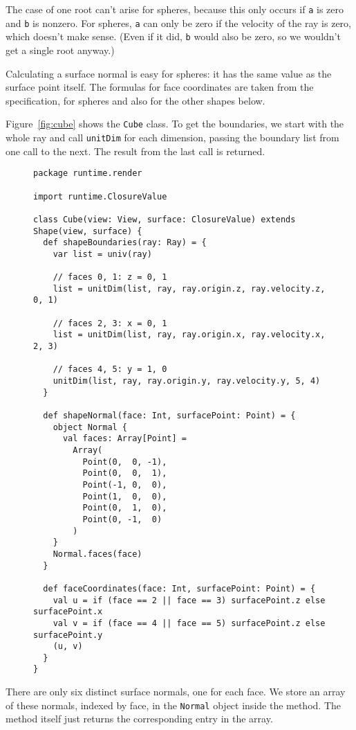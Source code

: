 The case of one root can't arise for spheres,
because this only occurs if \verb!a! is zero and \verb!b! is nonzero.
For spheres, \verb!a! can only be zero if the velocity of the ray is zero,
which doesn't make sense.
(Even if it did, \verb!b! would also be zero,
so we wouldn't get a single root anyway.)

Calculating a surface normal is easy for spheres:
it has the same value as the surface point itself.
The formulas for face coordinates are taken from the specification,
for spheres and also for the other shapes below.

Figure~\ref{fig:cube} shows the \verb!Cube! class.
To get the boundaries,
we start with the whole ray and call \verb!unitDim! for each dimension,
passing the boundary list from one call to the next.
The result from the last call is returned.

\begin{figure}
\begin{verbatim}
package runtime.render

import runtime.ClosureValue

class Cube(view: View, surface: ClosureValue) extends Shape(view, surface) {
  def shapeBoundaries(ray: Ray) = {
    var list = univ(ray)

    // faces 0, 1: z = 0, 1
    list = unitDim(list, ray, ray.origin.z, ray.velocity.z, 0, 1)

    // faces 2, 3: x = 0, 1
    list = unitDim(list, ray, ray.origin.x, ray.velocity.x, 2, 3)

    // faces 4, 5: y = 1, 0
    unitDim(list, ray, ray.origin.y, ray.velocity.y, 5, 4)
  }

  def shapeNormal(face: Int, surfacePoint: Point) = {
    object Normal {
      val faces: Array[Point] =
        Array(
          Point(0,  0, -1),
          Point(0,  0,  1),
          Point(-1, 0,  0),
          Point(1,  0,  0),
          Point(0,  1,  0),
          Point(0, -1,  0)
        )
    }
    Normal.faces(face)
  }

  def faceCoordinates(face: Int, surfacePoint: Point) = {
    val u = if (face == 2 || face == 3) surfacePoint.z else surfacePoint.x
    val v = if (face == 4 || face == 5) surfacePoint.z else surfacePoint.y
    (u, v)
  }
}
\end{verbatim}
\getcaption
\end{figure}

There are only six distinct surface normals, one for each face.
We store an array of these normals, indexed by face,
in the \verb!Normal! object inside the method.
The method itself just returns the corresponding entry in the array.

